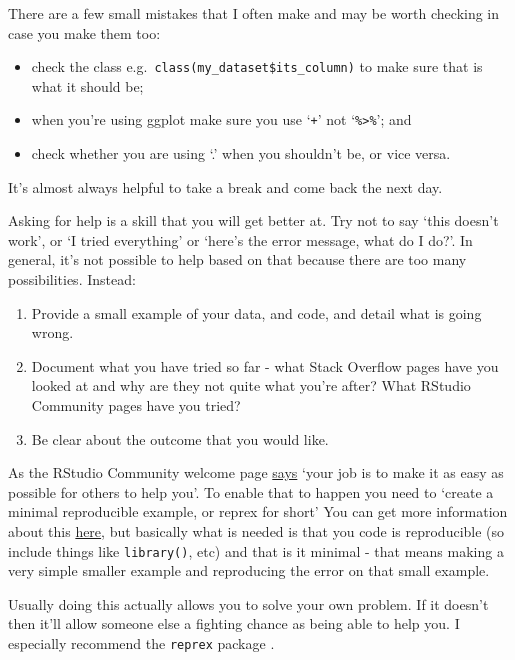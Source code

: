 \documentclass[
]{book}
\providecommand{\tightlist}{%
  \setlength{\itemsep}{0pt}\setlength{\parskip}{0pt}}
\begin{document}
There are a few small mistakes that I often make and may be worth checking in case you make them too:

\begin{itemize}
\tightlist
\item
  check the class e.g.~\texttt{class(my\_dataset\$its\_column)} to make sure that is what it should be;
\item
  when you're using ggplot make sure you use `\texttt{+}' not `\texttt{\%\textgreater{}\%}'; and
\item
  check whether you are using `.' when you shouldn't be, or vice versa.
\end{itemize}

It's almost always helpful to take a break and come back the next day.

Asking for help is a skill that you will get better at. Try not to say `this doesn't work', or `I tried everything' or `here's the error message, what do I do?'. In general, it's not possible to help based on that because there are too many possibilities. Instead:

\begin{enumerate}
\def\labelenumi{\arabic{enumi}.}
\tightlist
\item
  Provide a small example of your data, and code, and detail what is going wrong.
\item
  Document what you have tried so far - what Stack Overflow pages have you looked at and why are they not quite what you're after? What RStudio Community pages have you tried?
\item
  Be clear about the outcome that you would like.
\end{enumerate}

As the RStudio Community welcome page \href{https://community.rstudio.com/t/welcome-to-the-rstudio-community/8}{says} `your job is to make it as easy as possible for others to help you'. To enable that to happen you need to `create a minimal reproducible example, or reprex for short' You can get more information about this \href{https://www.tidyverse.org/help/\#reprex}{here}, but basically what is needed is that you code is reproducible (so include things like \texttt{library()}, etc) and that is it minimal - that means making a very simple smaller example and reproducing the error on that small example.

Usually doing this actually allows you to solve your own problem. If it doesn't then it'll allow someone else a fighting chance as being able to help you. I especially recommend the \texttt{reprex} package \citep{citereprex}.
\end{document}
